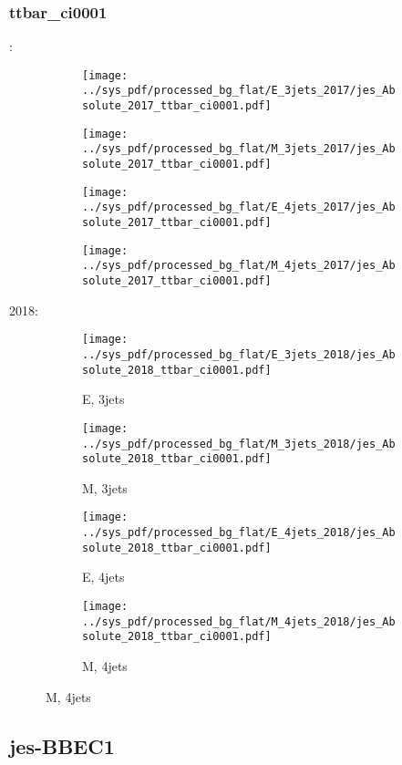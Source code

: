 \documentclass{beamer}
\begin{document}
\begin{frame}
\frametitle{ttbar_ci0001}
\fontsize{5}{1}:
\begin{figure}
\centering
\begin{subfigure}[b]{0.24\textwidth}
\texttt{[image: ../sys\_pdf/processed\_bg\_flat/E\_3jets\_2017/jes\_Absolute\_2017\_ttbar\_ci0001.pdf]}
\end{subfigure}
\begin{subfigure}[b]{0.24\textwidth}
\texttt{[image: ../sys\_pdf/processed\_bg\_flat/M\_3jets\_2017/jes\_Absolute\_2017\_ttbar\_ci0001.pdf]}
\end{subfigure}
\begin{subfigure}[b]{0.24\textwidth}
\texttt{[image: ../sys\_pdf/processed\_bg\_flat/E\_4jets\_2017/jes\_Absolute\_2017\_ttbar\_ci0001.pdf]}
\end{subfigure}
\begin{subfigure}[b]{0.24\textwidth}
\texttt{[image: ../sys\_pdf/processed\_bg\_flat/M\_4jets\_2017/jes\_Absolute\_2017\_ttbar\_ci0001.pdf]}
\end{subfigure}
\end{figure}
2018:
\begin{figure}
\centering
\begin{subfigure}[b]{0.24\textwidth}
\texttt{[image: ../sys\_pdf/processed\_bg\_flat/E\_3jets\_2018/jes\_Absolute\_2018\_ttbar\_ci0001.pdf]}
\captionsetup{font=tiny}
\caption{E, 3jets}
\end{subfigure}
\begin{subfigure}[b]{0.24\textwidth}
\texttt{[image: ../sys\_pdf/processed\_bg\_flat/M\_3jets\_2018/jes\_Absolute\_2018\_ttbar\_ci0001.pdf]}
\captionsetup{font=tiny}
\caption{M, 3jets}
\end{subfigure}
\begin{subfigure}[b]{0.24\textwidth}
\texttt{[image: ../sys\_pdf/processed\_bg\_flat/E\_4jets\_2018/jes\_Absolute\_2018\_ttbar\_ci0001.pdf]}
\captionsetup{font=tiny}
\caption{E, 4jets}
\end{subfigure}
\begin{subfigure}[b]{0.24\textwidth}
\texttt{[image: ../sys\_pdf/processed\_bg\_flat/M\_4jets\_2018/jes\_Absolute\_2018\_ttbar\_ci0001.pdf]}
\captionsetup{font=tiny}
\caption{M, 4jets}
\end{subfigure}
\end{figure}
\end{frame}


\subsection{jes-BBEC1}
\end{document}
